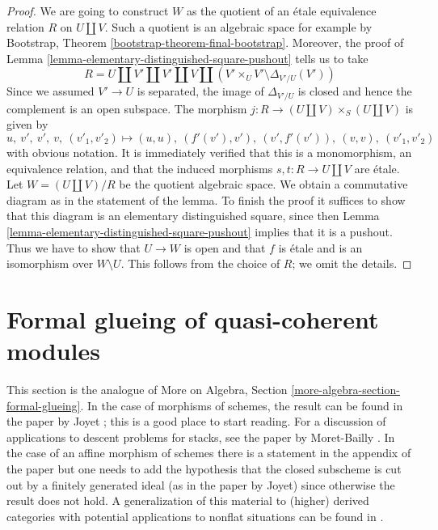 \begin{proof}
We are going to construct $W$ as the quotient of an \'etale
equivalence relation $R$ on $U \amalg V$. Such a quotient is an
algebraic space for example by
Bootstrap, Theorem \ref{bootstrap-theorem-final-bootstrap}.
Moreover, the proof of
Lemma \ref{lemma-elementary-distinguished-square-pushout} tells us to take
$$
R = U \amalg V' \amalg V' \amalg V \amalg
(V' \times_U V' \setminus \Delta_{V'/U}(V'))
$$
Since we assumed $V' \to U$ is separated, the image of
$\Delta_{V'/U}$ is closed and hence the complement is an
open subspace. The morphism $j : R \to (U \amalg V) \times_S (U \amalg V)$
is given by
$$
u,\ v',\ v',\ v,\ (v'_1, v'_2) \mapsto
(u, u),\ (f'(v'), v'),\ (v', f'(v')),\ (v, v),\ (v'_1, v'_2)
$$
with obvious notation. It is immediately verified that this is a
monomorphism, an equivalence relation, and that the induced morphisms
$s, t : R \to U \amalg V$ are \'etale. Let
$W = (U \amalg V)/R$ be the quotient algebraic space.
We obtain a commutative diagram as in the statement of the lemma.
To finish the proof it suffices to show that this diagram is
an elementary distinguished square, since then
Lemma \ref{lemma-elementary-distinguished-square-pushout}
implies that it is a pushout.
Thus we have to show that $U \to W$ is open and that
$f$ is \'etale and is an isomorphism over $W \setminus U$.
This follows from the choice of $R$; we omit the details.
\end{proof}






\section{Formal glueing of quasi-coherent modules}
\label{section-formal-glueing}

\noindent
This section is the analogue of
More on Algebra, Section \ref{more-algebra-section-formal-glueing}.
In the case of morphisms of schemes, the result can be found in
the paper by Joyet \cite{Joyet}; this is a good place to start reading.
For a discussion of applications to descent problems for stacks, see the
paper by Moret-Bailly \cite{MB}. In the case of an affine
morphism of schemes there is a statement in the appendix of the paper
\cite{Ferrand-Raynaud} but one needs to add the hypothesis
that the closed subscheme is cut out by a finitely generated
ideal (as in the paper by Joyet) since otherwise the result does not hold.
A generalization of this material to (higher) derived categories
with potential applications to nonflat situations
can be found in \cite[Section 5]{Bhatt-Algebraize}.

